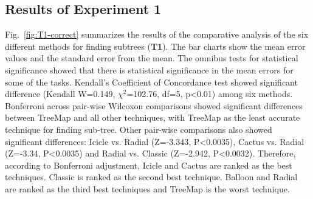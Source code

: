 \documentclass[a4paper]{llncs}
\begin{document}
\subsection{Results of Experiment 1} Fig.~\ref{fig:T1-correct} summarizes the results of the comparative analysis of the six different methods for finding subtrees (\textbf{T1}). The bar charts show the mean error values and the standard error from the mean. The omnibus tests for statistical significance showed that there is statistical significance in the mean errors for some of the tasks. Kendall's Coefficient of Concordance test showed significant difference (Kendall W=0.149, $\chi^2$=102.76, df=5, p\textless0.01) among six methods. Bonferroni across pair-wise Wilcoxon comparisons showed significant differences between TreeMap and all other techniques, with TreeMap as the least accurate technique for finding sub-tree. Other pair-wise comparisons also showed significant differences: Icicle vs. Radial (Z=-3.343, P\textless0.0035), Cactus vs. Radial (Z=-3.34, P\textless0.0035) and Radial vs. Classic (Z=-2.942, P\textless0.0032). Therefore, according to Bonferroni adjustment, Icicle and Cactus are ranked as the best techniques. Classic is ranked as the second best technique. Balloon and Radial are ranked as the third best techniques and TreeMap is the worst technique.


\end{document}
